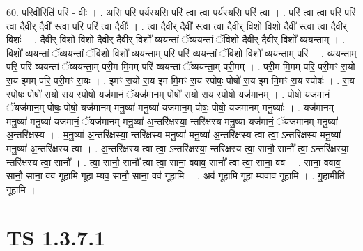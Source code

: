 \documentclass[17pt]{extarticle}
\begin{document}
60. प॒रि॒वीरिति॑ परि - वीः । . अ॒सि॒ परि॒ पर्य॑स्यसि॒ परि॑ त्वा त्वा॒ पर्य॑स्यसि॒ परि॑ त्वा । . परि॑ त्वा त्वा॒ परि॒ परि॑ त्वा॒ दैवी॒र् दैवी᳚ स्त्वा॒ परि॒ परि॑ त्वा॒ दैवीः᳚ । . त्वा॒ दैवी॒र् दैवी᳚ स्त्वा त्वा॒ दैवी॒र् विशो॒ विशो॒ दैवी᳚ स्त्वा त्वा॒ दैवी॒र् विशः॑ । . दैवी॒र् विशो॒ विशो॒ दैवी॒र् दैवी॒र् विशो᳚ व्ययन्तां ॅव्ययन्तां॒ ॅविशो॒ दैवी॒र् दैवी॒र् विशो᳚ व्ययन्ताम् । . विशो᳚ व्ययन्तां ॅव्ययन्तां॒ ॅविशो॒ विशो᳚ व्ययन्ता॒म् परि॒ परि॑ व्ययन्तां॒ ॅविशो॒ विशो᳚ व्ययन्ता॒म् परि॑ । . व्य॒य॒न्ता॒म् परि॒ परि॑ व्ययन्तां ॅव्ययन्ता॒म् परी॒म मि॒मम् परि॑ व्ययन्तां ॅव्ययन्ता॒म् परी॒मम् । . परी॒म मि॒मम् परि॒ परी॒मꣳ रा॒यो रा॒य इ॒मम् परि॒ परी॒मꣳ रा॒यः । . इ॒मꣳ रा॒यो रा॒य इ॒म मि॒मꣳ रा॒य स्पोषः॒ पोषो॑ रा॒य इ॒म मि॒मꣳ रा॒य स्पोषः॑ । . रा॒य स्पोषः॒ पोषो॑ रा॒यो रा॒य स्पोषो॒ यज॑मानं॒ ॅयज॑मान॒म् पोषो॑ रा॒यो रा॒य स्पोषो॒ यज॑मानम् । . पोषो॒ यज॑मानं॒ ॅयज॑मान॒म् पोषः॒ पोषो॒ यज॑मानम् मनु॒ष्या॑ मनु॒ष्या॑ यज॑मान॒म् पोषः॒ पोषो॒ यज॑मानम् मनु॒ष्याः᳚ । . यज॑मानम् मनु॒ष्या॑ मनु॒ष्या॑ यज॑मानं॒ ॅयज॑मानम् मनु॒ष्या॑ अ॒न्तरि॑क्षस्या॒ न्तरि॑क्षस्य मनु॒ष्या॑ यज॑मानं॒ ॅयज॑मानम् मनु॒ष्या॑ अ॒न्तरि॑क्षस्य । . म॒नु॒ष्या॑ अ॒न्तरि॑क्षस्या॒ न्तरि॑क्षस्य मनु॒ष्या॑ मनु॒ष्या॑ अ॒न्तरि॑क्षस्य त्वा त्वा॒ ऽन्तरि॑क्षस्य मनु॒ष्या॑ मनु॒ष्या॑ अ॒न्तरि॑क्षस्य त्वा । . अ॒न्तरि॑क्षस्य त्वा त्वा॒ ऽन्तरि॑क्षस्या॒ न्तरि॑क्षस्य त्वा॒ सानौ॒ सानौ᳚ त्वा॒ ऽन्तरि॑क्षस्या॒ न्तरि॑क्षस्य त्वा॒ सानौ᳚ । . त्वा॒ सानौ॒ सानौ᳚ त्वा त्वा॒ साना॒ ववाव॒ सानौ᳚ त्वा त्वा॒ साना॒ वव॑ । . साना॒ ववाव॒ सानौ॒ साना॒ वव॑ गूहामि गूहा॒ म्यव॒ सानौ॒ साना॒ वव॑ गूहामि । . अव॑ गूहामि गूहा॒ म्यवाव॑ गूहामि । . गू॒हा॒मीति॑ गूहामि । \newline
\pagebreak
{}
\section*{ TS 1.3.7.1 }
\end{document}
